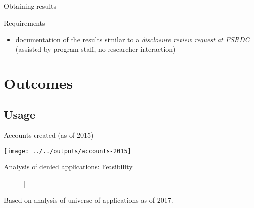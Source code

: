 \begin{frame}{Obtaining results}
\scalebox{0.1}{\myworkflow}
\scalebox{0.6}{
	\obtainingresults{}
}
\begin{block}{Requirements}
\begin{itemize}
			\item documentation of the results similar to a		{\it \color{orange}	disclosure review request at \ac{FSRDC}} (assisted by program staff, no researcher interaction)
		\end{itemize}
\end{block}

\end{frame}









\section{Outcomes}

\subsection{Usage}

\begin{frame}{Accounts created (as of 2015)}
	\begin{center}
		\texttt{[image: ../../outputs/accounts-2015]}
	\end{center}
\end{frame}


%



\begin{frame}{Analysis of denied applications: Feasibility}
\begin{figure}[h]
	\Tree[.{SynLBD applications as of 2017 (100)} 
	[.{Accepted (79)}
	]
	[.{Denied (21)}
	[. {Firm vars (6)} {Geo vars (11)} {NAICS (1)}
	]  ]
	]
\end{figure}
\tiny Based on analysis of universe of applications as of 2017.
\end{frame}



